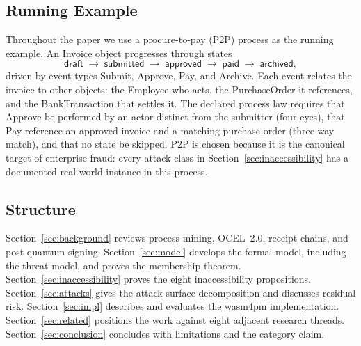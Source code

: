 \subsection{Running Example}
\label{sec:running-example}

Throughout the paper we use a procure-to-pay (P2P) process as the running
example. An \textsf{Invoice} object progresses through states
\[
  \textsf{draft} \;\to\; \textsf{submitted} \;\to\; \textsf{approved}
  \;\to\; \textsf{paid} \;\to\; \textsf{archived},
\]
driven by event types \textsf{Submit}, \textsf{Approve}, \textsf{Pay}, and
\textsf{Archive}. Each event relates the invoice to other objects: the
\textsf{Employee} who acts, the \textsf{PurchaseOrder} it references, and the
\textsf{BankTransaction} that settles it. The declared process law requires
that \textsf{Approve} be performed by an actor distinct from the submitter
(four-eyes), that \textsf{Pay} reference an approved invoice and a matching
purchase order (three-way match), and that no state be skipped. P2P is chosen
because it is the canonical target of enterprise fraud: every attack class in
Section~\ref{sec:inaccessibility} has a documented real-world instance in this
process.

\subsection{Structure}

Section~\ref{sec:background} reviews process mining, OCEL~2.0, receipt chains,
and post-quantum signing. Section~\ref{sec:model} develops the formal model,
including the threat model, and proves the membership theorem.
Section~\ref{sec:inaccessibility} proves the eight inaccessibility propositions.
Section~\ref{sec:attacks} gives the attack-surface decomposition and discusses
residual risk. Section~\ref{sec:impl} describes and evaluates the wasm4pm
implementation. Section~\ref{sec:related} positions the work against eight
adjacent research threads. Section~\ref{sec:conclusion} concludes with
limitations and the category claim.
